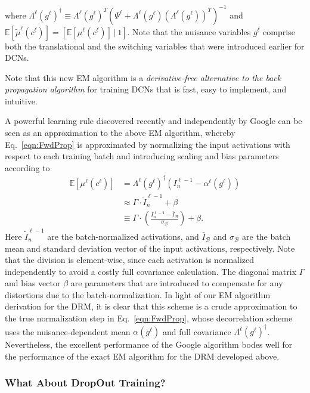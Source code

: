 \documentclass[12pt]{article}
\newcommand{\Expect}[0]{{ \mathbb{E} }}
\newcommand{\dg}[0]{{ \dagger }}
\begin{document}
where $\Lambda^{\ell}(g^{\ell})^{\dg} \equiv \Lambda^{\ell}(g^{\ell})^{T}(\Psi^{\ell}+\Lambda^{\ell}(g^{\ell})(\Lambda^{\ell}(g^{\ell}))^{T})^{-1}$ and $\Expect \left[ \tilde{\mu}^{\ell}(c^{\ell}) \right] = \left[\Expect \left[ \mu^{\ell}(c^{\ell}) \right] \,|\ 1\right]$. Note that the nuisance variables $g^{\ell}$ comprise both the translational and the switching variables that were introduced earlier for DCNs.

Note that this new EM algorithm is a \emph{derivative-free alternative to the back propagation algorithm} for training DCNs that is fast, easy to implement, and intuitive. 

A powerful learning rule discovered recently and independently by Google \cite{ioffe2015batch} can be seen as an approximation to the above EM algorithm, whereby Eq.~\ref{eqn:FwdProp} is approximated by normalizing the input activations with respect to each training batch and introducing scaling and bias parameters according to
\begin{align}
	\Expect \left[ \mu^{\ell}(c^{\ell}) \right] 
	    	&=  \Lambda^{\ell}(g^{\ell})^{\dg}(I^{\ell-1}_{n} - \alpha^{\ell}(g^{\ell})) \nonumber\\
		&\approx \Gamma \cdot \tilde{I}^{\ell-1}_n + \beta \nonumber\\
		&\equiv \Gamma \cdot \left( \frac{ I^{\ell-1}_n - \bar{I}_{\mathcal{B}} } {\sigma_{\mathcal{B}}} \right) + \beta.
\end{align}
Here $\tilde{I}^{\ell-1}_n$ are the batch-normalized activations, and $\bar{I}_{\mathcal{B}}$ and $\sigma_{\mathcal{B}}$ are the batch mean and standard deviation vector of the input activations, respectively. Note that the division is element-wise, since each activation is normalized independently to avoid a costly full covariance calculation. The diagonal matrix $\Gamma$ and bias vector $\beta$ are parameters that are introduced to compensate for any distortions due to the batch-normalization. 
In light of our EM algorithm derivation for the DRM, it is clear that this scheme is a crude approximation to the true normalization step in Eq.~\ref{eqn:FwdProp}, whose decorrelation scheme uses the nuisance-dependent mean $\alpha(g^{\ell})$ and full covariance $\Lambda^{\ell}(g^{\ell})^{\dg}$.
Nevertheless, the excellent performance of the Google algorithm bodes well for the performance of the exact EM algorithm for the DRM developed above.

\subsubsection{What About DropOut Training?} \label{sec:DropOut}
\end{document}
